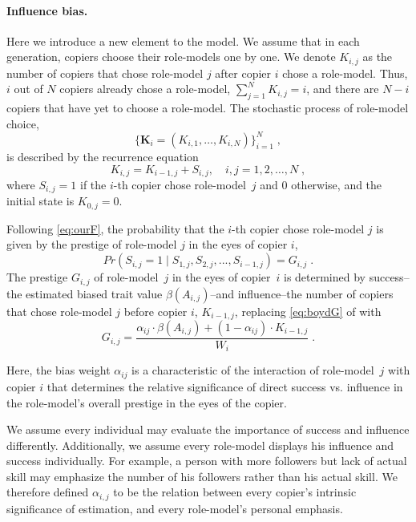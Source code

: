 \documentclass[12pt]{extarticle}
\let\vec\mathbf
\begin{document}
\paragraph{Influence bias.}
Here we introduce a new element to the model.
We assume that in each generation, copiers choose their role-models one by one.
We denote $K_{i,j}$ as the number of copiers that chose role-model $j$ after copier $i$ chose a role-model. Thus, $i$ out of $N$ copiers already chose a role-model, $\sum_{j=1}^N{K_{i,j}} = i$, and there are $N-i$ copiers that have yet to choose a role-model.
The stochastic process of role-model choice, 
\begin{equation} \label{eq:process}
\big\{\vec{K}_i = (K_{i,1}, \ldots, K_{i,N}) \big\}_{i=1}^N \;,
\end{equation}
is described by the recurrence equation
\begin{equation} \label{eq:recurrence}
K_{i,j} = K_{i-1,j} + S_{i,j}, \quad i,j=1,2,\ldots,N \;,
\end{equation}
where $S_{i,j}=1$ if the $i$-th copier chose role-model~$j$ and 0 otherwise, and the initial state is $K_{0,j}=0$.

Following \cref{eq:ourF}, the probability that the $i$-th copier chose role-model $j$ is given by the prestige of role-model $j$ in the eyes of copier $i$,
\begin{equation}\label{eq:recPrestige}
Pr(S_{i,j}=1 \mid S_{1,j},S_{2,j},...,S_{i-1,j}) = G_{i,j} \;.
\end{equation}
The prestige $G_{i,j}$ of role-model~$j$ in the eyes of copier~$i$ is determined by success--the estimated biased trait value $\beta(A_{i,j})$--and influence--the number of copiers that chose role-model $j$ before copier $i$, $K_{i-1,j}$, replacing \cref{eq:boydG} of \citet{evolutionBook} with
\begin{equation}\label{eq:prestige}
G_{i,j} = \frac{\alpha_{ij} \cdot \beta(A_{i,j}) + (1-\alpha_{ij}) \cdot K_{i-1,j}}{W_i} \;.
\end{equation}

Here, the bias weight $\alpha_{ij}$ is a characteristic of the interaction of role-model~$j$ with copier $i$ that determines the relative significance of direct success vs. influence in the role-model's overall prestige in the eyes of the copier.

We assume every individual may evaluate the importance of success and influence differently. Additionally, we assume every role-model displays his influence and success individually. For example, a person with more followers but lack of actual skill may emphasize the number of his followers rather than his actual skill. We therefore defined $\alpha_{i,j}$ to be the relation between every copier's intrinsic significance of estimation, and every role-model's personal emphasis.
 
\end{document}
